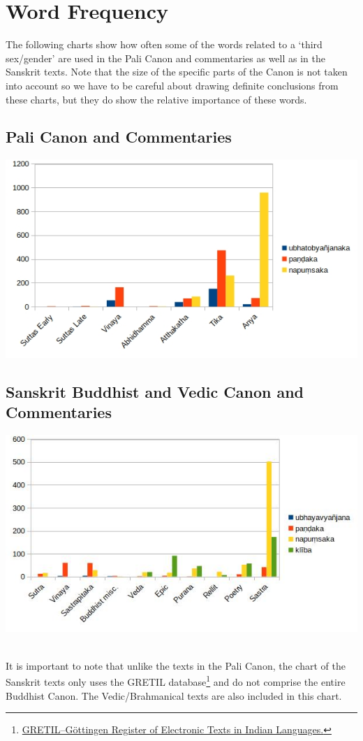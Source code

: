 \section{Word Frequency}
\label{appendix2}

The following charts show how often some of the words related to a `third sex/gender' are used in the Pali Canon and commentaries as well as in the Sanskrit texts. Note that the size of the specific parts of the Canon is not taken into account so we have to be careful about drawing definite conclusions from these charts, but they do show the relative importance of these words. 

\subsection{Pali Canon and Commentaries}

\includegraphics[width=0.7\linewidth]{pali.jpg}

\begin{minipage}{0.8\linewidth}
\label{pali1}
\end{minipage}

\subsection{Sanskrit Buddhist and Vedic Canon and Commentaries}

\includegraphics[width=0.7\linewidth]{sanskrit.jpg}

\begin{minipage}{0.7\linewidth}
\label{sanskrit1}
\end{minipage}
\medskip
\\
It is important to note that unlike the texts in the Pali Canon, the chart of the Sanskrit texts only uses the GRETIL database\footnote{\href{http://gretil.sub.uni-goettingen.de/gretil.html}{GRETIL--Göttingen Register of Electronic Texts in Indian Languages.}} and do not comprise the entire Buddhist Canon. The Vedic/Brahmanical texts are also included in this chart.
